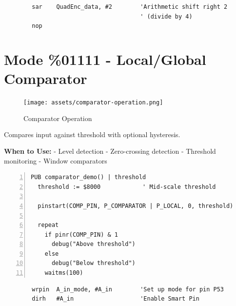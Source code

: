 \documentclass[11pt,a4paper,oneside,english]{book}
\begin{document}
\begin{PASM2Block}
\begin{lstlisting}
        sar    QuadEnc_data, #2        'Arithmetic shift right 2
                                       ' (divide by 4)
        nop
\end{lstlisting}
\end{PASM2Block}

\clearpage

\hypertarget{mode-01111---localglobal-comparator}{%
\section{Mode \%01111 - Local/Global
Comparator}\label{mode-01111---localglobal-comparator}}

\begin{figure}
\centering
\texttt{[image: assets/comparator-operation.png]}
\caption{Comparator Operation}
\end{figure}

Compares input against threshold with optional hysteresis.

\textbf{When to Use:} - Level detection - Zero-crossing detection -
Threshold monitoring - Window comparators

\begin{Spin2Block}
\begin{Verbatim}[numbers=left,numbersep=5pt,xleftmargin=15pt]
PUB comparator_demo() | threshold
  threshold := $8000            ' Mid-scale threshold
  
  pinstart(COMP_PIN, P_COMPARATOR | P_LOCAL, 0, threshold)
  
  repeat
    if pinr(COMP_PIN) & 1
      debug("Above threshold")
    else
      debug("Below threshold")
    waitms(100)
\end{Verbatim}
\end{Spin2Block}

\begin{PASM2Block}
\begin{lstlisting}
        wrpin  A_in_mode, #A_in        'Set up mode for pin P53
        dirh   #A_in                   'Enable Smart Pin
\end{lstlisting}
\end{PASM2Block}
\end{document}
